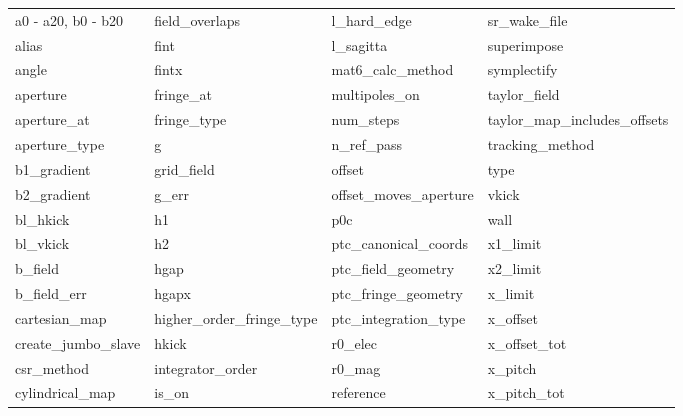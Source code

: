  \begin{tabular}{llll} \toprule
a0 - a20, b0 - b20          & field_overlaps              & l_hard_edge                 & sr_wake_file                \\
alias                       & fint                        & l_sagitta                   & superimpose                 \\
angle                       & fintx                       & mat6_calc_method            & symplectify                 \\
aperture                    & fringe_at                   & multipoles_on               & taylor_field                \\
aperture_at                 & fringe_type                 & num_steps                   & taylor_map_includes_offsets \\
aperture_type               & g                           & n_ref_pass                  & tracking_method             \\
b1_gradient                 & grid_field                  & offset                      & type                        \\
b2_gradient                 & g_err                       & offset_moves_aperture       & vkick                       \\
bl_hkick                    & h1                          & p0c                         & wall                        \\
bl_vkick                    & h2                          & ptc_canonical_coords        & x1_limit                    \\
b_field                     & hgap                        & ptc_field_geometry          & x2_limit                    \\
b_field_err                 & hgapx                       & ptc_fringe_geometry         & x_limit                     \\
cartesian_map               & higher_order_fringe_type    & ptc_integration_type        & x_offset                    \\
create_jumbo_slave          & hkick                       & r0_elec                     & x_offset_tot                \\
csr_method                  & integrator_order            & r0_mag                      & x_pitch                     \\
cylindrical_map             & is_on                       & reference                   & x_pitch_tot                 \\

\end{tabular}
